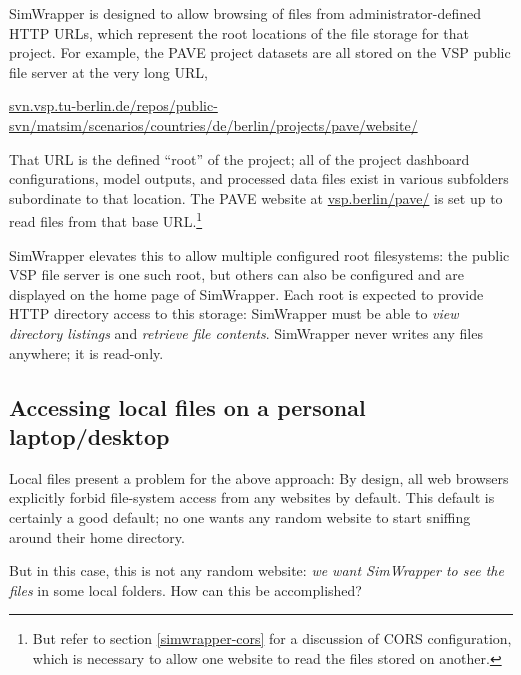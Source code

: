 SimWrapper is designed to allow browsing of files from administrator-defined HTTP URLs, which represent the root locations of the file storage for that project. For example, the PAVE project datasets are all stored on the VSP public file server at the very long URL,

\href{https://svn.vsp.tu-berlin.de/repos/public-svn/matsim/scenarios/countries/de/berlin/projects/pave/website/}{svn.vsp.tu-berlin.de/repos/public-svn/matsim/scenarios/countries/de/berlin/projects/pave/website/}

That URL is the defined ``root'' of the project; all of the project dashboard configurations, model outputs, and processed data files exist in various subfolders subordinate to that location. The PAVE website at \href{https://vsp.berlin/pave/}{vsp.berlin/pave/} is set up to read files from that base URL.\footnote{But refer to section \ref{simwrapper-cors} for a discussion of CORS configuration, which is necessary to allow one website to read the files stored on another.}

SimWrapper elevates this to allow multiple configured root filesystems: the public VSP file server is one such root, but others can also be configured and are displayed on the home page of SimWrapper. Each root is expected to provide HTTP directory access to this storage: SimWrapper must be able to \emph{view directory listings} and \emph{retrieve file contents}. SimWrapper never writes any files anywhere; it is read-only.


\hypertarget{simwrapper-local-files-on-a-personal-laptopdesktop}{%
\subsection{Accessing local files on a personal laptop/desktop}\label{local-files-on-a-personal-laptopdesktop}}

Local files present a problem for the above approach: By design, all web browsers explicitly forbid file-system access from any websites by default. This default is certainly a good default; no one wants any random website to start sniffing around their home directory.

But in this case, this is not any random website: \emph{we want SimWrapper to see the files} in some local folders. How can this be accomplished?

